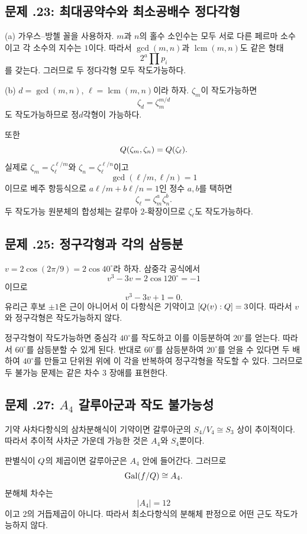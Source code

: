 \subsection*{문제 \thechapter.23: 최대공약수와 최소공배수 정다각형}

\begin{solution}
(a) 가우스--방첼 꼴을 사용하자. $m$과 $n$의 홀수 소인수는 모두 서로 다른 페르마 소수이고 각 소수의 지수는 $1$이다. 따라서 $\gcd(m,n)$과 $\operatorname{lcm}(m,n)$도 같은 형태
\[
  2^a\prod p_i
\]
를 갖는다. 그러므로 두 정다각형 모두 작도가능하다.

(b) $d=\gcd(m,n)$, $\ell=\operatorname{lcm}(m,n)$이라 하자. $\zeta_m$이 작도가능하면
\[
  \zeta_d=\zeta_m^{m/d}
\]
도 작도가능하므로 정$d$각형이 가능하다.

또한
\[
  Q(\zeta_m,\zeta_n)=Q(\zeta_\ell).
\]
실제로 $\zeta_m=\zeta_\ell^{\ell/m}$와 $\zeta_n=\zeta_\ell^{\ell/n}$이고
\[
  \gcd(\ell/m,\ell/n)=1
\]
이므로 베주 항등식으로 $a\ell/m+b\ell/n=1$인 정수 $a,b$를 택하면
\[
  \zeta_\ell=\zeta_m^a\zeta_n^b.
\]
두 작도가능 원분체의 합성체는 갈루아 $2$-확장이므로 $\zeta_\ell$도 작도가능하다.
\end{solution}

\subsection*{문제 \thechapter.25: 정구각형과 각의 삼등분}

\begin{solution}
$v=2\cos(2\pi/9)=2\cos40^\circ$라 하자. 삼중각 공식에서
\[
  v^3-3v=2\cos120^\circ=-1
\]
이므로
\[
  v^3-3v+1=0.
\]
유리근 후보 $\pm1$은 근이 아니어서 이 다항식은 기약이고 $[Q(v):Q]=3$이다. 따라서 $v$와 정구각형은 작도가능하지 않다.

정구각형이 작도가능하면 중심각 $40^\circ$를 작도하고 이를 이등분하여 $20^\circ$를 얻는다. 따라서 $60^\circ$를 삼등분할 수 있게 된다. 반대로 $60^\circ$를 삼등분하여 $20^\circ$를 얻을 수 있다면 두 배하여 $40^\circ$를 만들고 단위원 위에 이 각을 반복하여 정구각형을 작도할 수 있다. 그러므로 두 불가능 문제는 같은 차수 $3$ 장애를 표현한다.
\end{solution}

\subsection*{문제 \thechapter.27: $A_4$ 갈루아군과 작도 불가능성}

\begin{solution}
기약 사차다항식의 삼차분해식이 기약이면 갈루아군의 $S_4/V_4\cong S_3$ 상이 추이적이다. 따라서 추이적 사차군 가운데 가능한 것은 $A_4$와 $S_4$뿐이다.

판별식이 $Q$의 제곱이면 갈루아군은 $A_4$ 안에 들어간다. 그러므로
\[
  \operatorname{Gal}(f/Q)\cong A_4.
\]
분해체 차수는
\[
  |A_4|=12
\]
이고 $2$의 거듭제곱이 아니다. 따라서 최소다항식의 분해체 판정으로 어떤 근도 작도가능하지 않다.
\end{solution}

